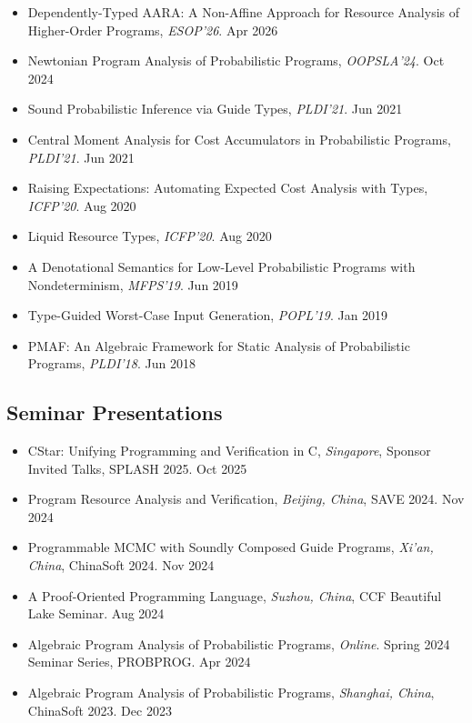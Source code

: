 \documentclass[11pt,letterpaper,sans]{moderncv}
\begin{document}
\begin{itemize}
  \item {Dependently-Typed AARA: A Non-Affine Approach for Resource Analysis of Higher-Order Programs}, \emph{ESOP'26}. \hfill Apr 2026
  \item {Newtonian Program Analysis of Probabilistic Programs}, \emph{OOPSLA'24}. \hfill Oct 2024
  \item {Sound Probabilistic Inference via Guide Types}, \emph{PLDI'21}. \hfill Jun 2021
  \item {Central Moment Analysis for Cost Accumulators in Probabilistic Programs}, \emph{PLDI'21}. \hfill Jun 2021
  \item {Raising Expectations: Automating Expected Cost Analysis with Types}, \emph{ICFP'20}. \hfill Aug 2020
  \item {Liquid Resource Types}, \emph{ICFP'20}. \hfill Aug 2020
  \item {A Denotational Semantics for Low-Level Probabilistic Programs with Nondeterminism}, \emph{MFPS'19}. \hfill Jun 2019
  \item {Type-Guided Worst-Case Input Generation}, \emph{POPL'19}. \hfill Jan 2019
  \item {PMAF: An Algebraic Framework for Static Analysis of Probabilistic Programs}, \emph{PLDI'18}. \hfill Jun 2018
\end{itemize}

\subsection{Seminar Presentations}

\begin{itemize}
  \item {CStar: Unifying Programming and Verification in C}, \emph{Singapore}, Sponsor Invited Talks, SPLASH 2025. \hfill Oct 2025
  \item {Program Resource Analysis and Verification}, \emph{Beijing, China}, SAVE 2024. \hfill Nov 2024
  \item {Programmable MCMC with Soundly Composed Guide Programs}, \emph{Xi'an, China}, ChinaSoft 2024. \hfill Nov 2024
  \item {A Proof-Oriented Programming Language}, \emph{Suzhou, China}, CCF Beautiful Lake Seminar. \hfill Aug 2024
  \item {Algebraic Program Analysis of Probabilistic Programs}, \emph{Online}. Spring 2024 Seminar Series, PROBPROG. \hfill Apr 2024
  \item {Algebraic Program Analysis of Probabilistic Programs}, \emph{Shanghai, China}, ChinaSoft 2023. \hfill Dec 2023
\end{itemize}
\end{document}
